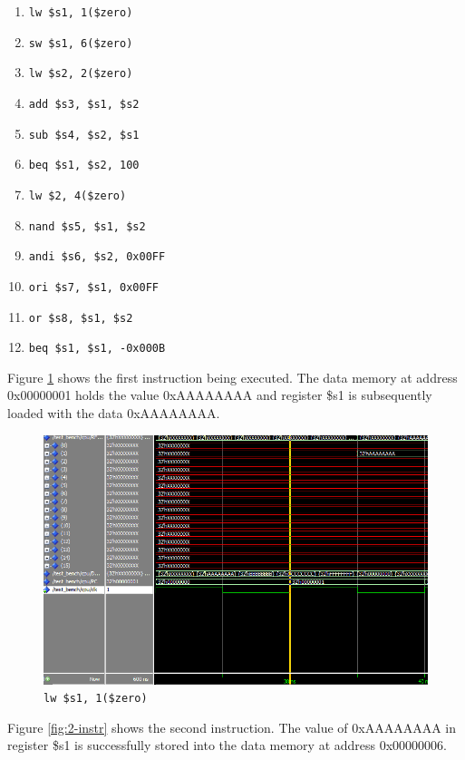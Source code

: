 \documentclass[12pt]{article}
\begin{document}
\begin{enumerate}
	\item \texttt{lw \$s1, 1(\$zero)}
	\item \texttt{sw \$s1, 6(\$zero)}
	\item \texttt{lw \$s2, 2(\$zero)}
	\item \texttt{add \$s3, \$s1, \$s2}
	\item \texttt{sub \$s4, \$s2, \$s1}
	\item \texttt{beq \$s1, \$s2, 100}
	\item \texttt{lw \$2, 4(\$zero)}
	\item \texttt{nand \$s5, \$s1, \$s2}
	\item \texttt{andi \$s6, \$s2, 0x00FF}
	\item \texttt{ori \$s7, \$s1, 0x00FF}
	\item \texttt{or \$s8, \$s1, \$s2}
	\item \texttt{beq \$s1, \$s1, -0x000B}
\end{enumerate}
\newpage
Figure \ref{fig:1-instr} shows the first instruction being executed. The data memory at address 0x00000001 holds the value 0xAAAAAAAA and register \$s1 is subsequently loaded with the data 0xAAAAAAAA.
\begin{figure}[h!]
\centering
\includegraphics[width=\linewidth]{simulation/1-instr}
\caption{\texttt{lw \$s1, 1(\$zero)}}
\label{fig:1-instr}
\end{figure}
\clearpage
Figure \ref{fig:2-instr} shows the second instruction. The value of 0xAAAAAAAA in register \$s1 is successfully stored into the data memory at address 0x00000006.
\end{document}
